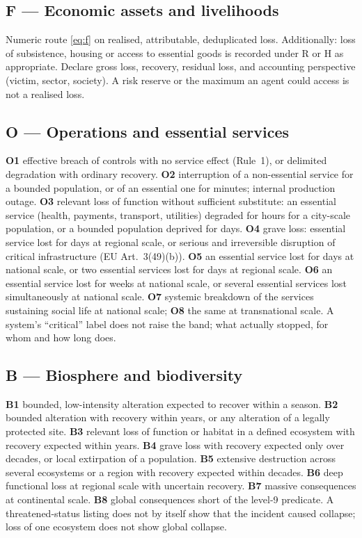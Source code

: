 \documentclass[11pt,a4paper]{article}
\begin{document}
\subsection{F --- Economic assets and livelihoods}
Numeric route \eqref{eq:f} on realised, attributable, deduplicated loss. Additionally: loss of subsistence, housing or access to essential goods is recorded under R or H as appropriate. Declare gross loss, recovery, residual loss, and accounting perspective (victim, sector, society). A risk reserve or the maximum an agent could access is not a realised loss.

\subsection{O --- Operations and essential services}
\textbf{O1} effective breach of controls with no service effect (Rule~1), or delimited degradation with ordinary recovery. \textbf{O2} interruption of a non-essential service for a bounded population, or of an essential one for minutes; internal production outage. \textbf{O3} relevant loss of function without sufficient substitute: an essential service (health, payments, transport, utilities) degraded for hours for a city-scale population, or a bounded population deprived for days. \textbf{O4} grave loss: essential service lost for days at regional scale, or serious and irreversible disruption of critical infrastructure (EU Art.~3(49)(b)). \textbf{O5} an essential service lost for days at national scale, or two essential services lost for days at regional scale. \textbf{O6} an essential service lost for weeks at national scale, or several essential services lost simultaneously at national scale. \textbf{O7} systemic breakdown of the services sustaining social life at national scale; \textbf{O8} the same at transnational scale. A system's ``critical'' label does not raise the band; what actually stopped, for whom and how long does.

\subsection{B --- Biosphere and biodiversity}
\textbf{B1} bounded, low-intensity alteration expected to recover within a season. \textbf{B2} bounded alteration with recovery within years, or any alteration of a legally protected site. \textbf{B3} relevant loss of function or habitat in a defined ecosystem with recovery expected within years. \textbf{B4} grave loss with recovery expected only over decades, or local extirpation of a population. \textbf{B5} extensive destruction across several ecosystems or a region with recovery expected within decades. \textbf{B6} deep functional loss at regional scale with uncertain recovery. \textbf{B7} massive consequences at continental scale. \textbf{B8} global consequences short of the level-9 predicate. A threatened-status listing does not by itself show that the incident caused collapse; loss of one ecosystem does not show global collapse.
\end{document}
